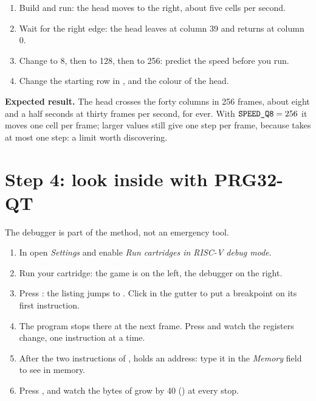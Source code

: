 \begin{prgcheck}
\begin{enumerate}[nosep]
\item Build and run: the head moves to the right, about five cells per second.
\item Wait for the right edge: the head leaves at column 39 and returns at
  column 0.
\item Change  to 8, then to 128, then to 256: predict the
  speed before you run.
\item Change the starting row in , and the colour of the head.
\end{enumerate}
\textbf{Expected result.} The head crosses the forty columns in 256 frames,
about eight and a half seconds at thirty frames per second, for ever. With
$\texttt{SPEED\_Q8}=256$ it moves one cell per frame; larger values still give
one step per frame, because  takes at most one step: a limit
worth discovering.
\end{prgcheck}

\section{Step 4: look inside with PRG32-QT}

The debugger is part of the method, not an emergency tool.

\begin{prgtry}
\begin{enumerate}[nosep]
\item In \prgqt open \emph{Settings} and enable \emph{Run cartridges in RISC-V
  debug mode}.
\item Run your cartridge: the game is on the left, the debugger on the right.
\item Press : the listing jumps to . Click in
  the gutter to put a breakpoint on its first instruction.
\item The program stops there at the next frame. Press  and watch
  the registers change, one instruction at a time.
\item After the two instructions of ,  holds an address: type
  it in the \emph{Memory} field to see  in memory.
\item Press , and watch the bytes of  grow by 40
  () at every stop.
\end{enumerate}
\end{prgtry}

